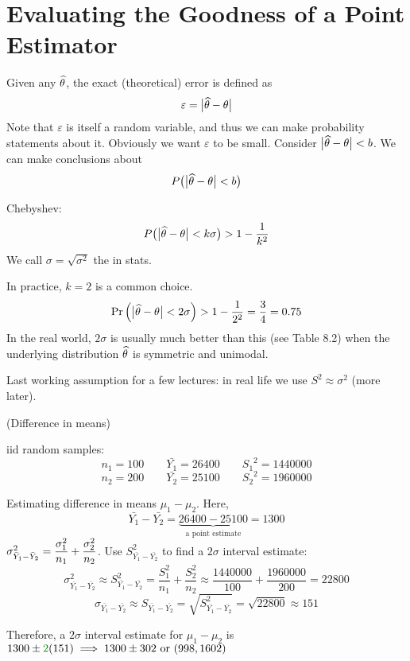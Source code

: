 \section{Evaluating the Goodness of a Point Estimator}
 Given any $\widehat{\theta}$, the exact (theoretical) error is defined as
$$\varepsilon = \big| \widehat{\theta} - \theta \big|$$
Note that $\varepsilon$ is itself a random variable, and thus we can make probability statements about it. Obviously we want $\varepsilon$ to be small. Consider $\big| \widehat{\theta} - \theta \big| < b$. We can make conclusions about
$$P\big(\big| \widehat{\theta} - \theta \big| < b\big)$$

\noindent Chebyshev: $$P\big(\big| \that - \theta \big| < k\sigma\big) > 1 - \over{k^2}$$
\remark We call $\sigma = \sqrt{\sigma^2}$ the  in stats.

\nl In practice, $k = 2$ is a common choice.
$$\P{\big| \that - \theta \big| < 2\sigma} > 1 - \over{2^2} = \frac{3}{4} = 0.75$$
In the real world, $2\sigma$ is usually much better than this (see Table 8.2) when the underlying distribution
$\widehat{\theta}$ is symmetric and unimodal.

\nl Last working assumption for a few lectures: in real life we use $S^2 \approx \sigma^2$ (more later).

\example (Difference in means)

 iid random samples:
$$n_1 = 100 \qquad \bar{Y_1} = \num[group-separator={,}]{26400} \qquad {S_1}^2 = \num{1440000}$$
$$n_2 = 200 \qquad \bar{Y_2} = \num{25100} \qquad {S_2}^2 = \num{1960000}$$

\nl Estimating difference in means $\mu_1 - \mu_2$. Here,
$$\bar{Y_1} - \bar{Y_2} = \underbrace{\num{26400} - \num{25100}}_{\text{a point estimate}} = \num{1300}$$
\recall $\sigma^2_{\bar{Y}_1 - \bar{Y}_2} = \dfrac{\sigma^2_1}{n_1} + \dfrac{\sigma^2_2}{n_2}$. Use $S^2_{\bar{Y_1} - \bar{Y_2}}$ to find a $2\sigma$ interval estimate:
$$\sigma^2_{\bar{Y_1} - \bar{Y_2}} \approx S^2_{\bar{Y_1} - \bar{Y_2}} = \frac{S_1^2}{n_1} + \frac{S_2^2}{n_2} \approx \frac{\num{1440000}}{100} + \frac{\num{1960000}}{200} = \num{22800}$$
$$\sigma_{\bar{Y_1} - \bar{Y_2}} \approx S_{\bar{Y_1} - \bar{Y_2}} = \sqrt{S_{\bar{Y_1} - \bar{Y_2}}^2} = \sqrt{\num{22800}} \approx 151$$

\nl Therefore, a $2\sigma$ interval estimate for $\mu_1 - \mu_2$ is $1300 \pm \green{2}(151) \implies 1300 \pm 302 \text{ or } (998, 1602)$